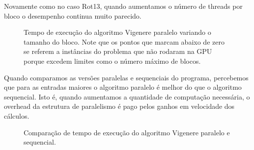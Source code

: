 \documentclass[12pt]{article}
\begin{document}
Novamente como no caso Rot13, quando aumentamos o número de threads por
bloco o desempenho continua muito parecido.

\begin{figure}[H]
    \caption{Tempo de execução do algoritmo Vigenere paralelo variando o
    tamanho do bloco. Note que os pontos que marcam abaixo de zero se
    referem a instâncias do problema que não rodaram na GPU porque 
    excedem limites como o número máximo de blocos.}
\end{figure}


Quando comparamos as versões paralelas e sequenciais do programa, 
percebemos que para as entradas maiores o algoritmo paralelo é melhor do
que o algoritmo sequencial. Isto é, quando aumentamos a quantidade de 
computação necessária, o overhead da estrutura de paralelismo é pago
pelos ganhos em velocidade dos cálculos.


\begin{figure}[H]
    \caption{Comparação de tempo de execução do algoritmo Vigenere
    paralelo e sequencial.}
\end{figure}
\end{document}
